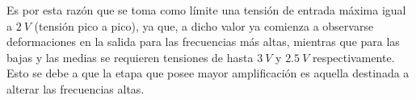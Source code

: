 Es por esta razón que se toma como límite una tensión de entrada máxima igual a $2 \ V$ (tensión pico a pico), ya que, a dicho valor ya comienza a observarse deformaciones en la salida para las frecuencias más altas, mientras que para las bajas y las medias se requieren tensiones de hasta $3 \ V$ y $2.5 \ V$ respectivamente. Esto se debe a que la etapa que posee mayor amplificación es aquella destinada a alterar las frecuencias altas.